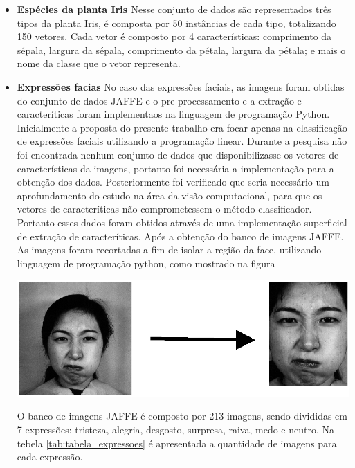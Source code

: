 \begin{itemize}
\item \textbf{Espécies da planta Iris \cite{Iris}}
Nesse conjunto de dados são representados três tipos da planta Iris, é composta por 50 instâncias de cada tipo, totalizando 150 vetores. Cada vetor é composto por 4 características: comprimento da sépala, largura da sépala, comprimento da pétala, largura da pétala; e mais o nome da classe que o vetor representa.

\item \textbf{Expressões facias}
No caso das expressões faciais, as imagens foram obtidas do conjunto de dados JAFFE \cite{Jaffe} e o pre processamento e a extração e caracteríticas foram implementaos na linguagem de programação Python.
Inicialmente a proposta do presente trabalho era focar apenas na classificação de expressões faciais utilizando a programação linear. Durante a pesquisa não foi encontrada nenhum conjunto de dados que disponibilizasse os vetores de características da imagens, portanto foi necessária a implementação para a obtenção dos dados. Posteriormente foi verificado que seria necessário um aprofundamento do estudo na área da visão computacional, para que os vetores de caracteríticas não comprometessem o método classificador. Portanto esses dados foram obtidos através de uma implementação superficial de extração de caracteríticas.
Após a obtenção do banco de imagens JAFFE. As imagens foram recortadas a fim de isolar a região da face, utilizando linguagem de programação python, como mostrado na figura

\begin{center}
	\includegraphics[scale=0.5]{graficos/jaffe}
	\label{img:jaffe}
\end{center}

O banco de imagens JAFFE é composto por 213 imagens, sendo divididas em 7 expressões: tristeza, alegria, desgosto, surpresa, raiva, medo e neutro. Na tebela \ref{tab:tabela_expressoes} é apresentada a quantidade de imagens para cada expressão.


\end{itemize}
